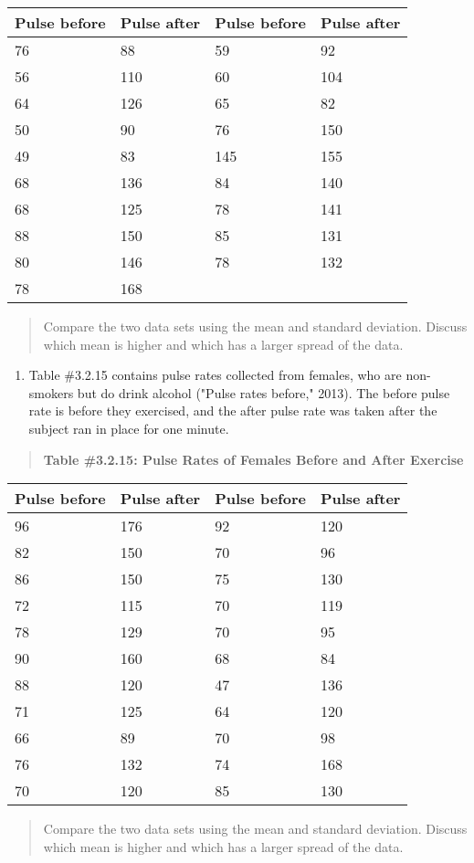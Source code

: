 \documentclass[]{book}
\providecommand{\tightlist}{%
  \setlength{\itemsep}{0pt}\setlength{\parskip}{0pt}}
\begin{document}
\begin{longtable}[]{@{}llll@{}}
\toprule
Pulse before & Pulse after & Pulse before & Pulse after\tabularnewline
\midrule
\endhead
76 & 88 & 59 & 92\tabularnewline
56 & 110 & 60 & 104\tabularnewline
64 & 126 & 65 & 82\tabularnewline
50 & 90 & 76 & 150\tabularnewline
49 & 83 & 145 & 155\tabularnewline
68 & 136 & 84 & 140\tabularnewline
68 & 125 & 78 & 141\tabularnewline
88 & 150 & 85 & 131\tabularnewline
80 & 146 & 78 & 132\tabularnewline
78 & 168 & &\tabularnewline
\bottomrule
\end{longtable}

\begin{quote}
Compare the two data sets using the mean and standard deviation.
Discuss which mean is higher and which has a larger spread of the
data.
\end{quote}

\begin{enumerate}
\def\labelenumi{\arabic{enumi}.}
\setcounter{enumi}{8}
\tightlist
\item
  Table \#3.2.15 contains pulse rates collected from females, who are
  non-smokers but do drink alcohol ("Pulse rates before," 2013). The
  before pulse rate is before they exercised, and the after pulse rate
  was taken after the subject ran in place for one minute.
\end{enumerate}

\begin{quote}
\textbf{Table \#3.2.15: Pulse Rates of Females Before and After Exercise}
\end{quote}

\begin{longtable}[]{@{}llll@{}}
\toprule
Pulse before & Pulse after & Pulse before & Pulse after\tabularnewline
\midrule
\endhead
96 & 176 & 92 & 120\tabularnewline
82 & 150 & 70 & 96\tabularnewline
86 & 150 & 75 & 130\tabularnewline
72 & 115 & 70 & 119\tabularnewline
78 & 129 & 70 & 95\tabularnewline
90 & 160 & 68 & 84\tabularnewline
88 & 120 & 47 & 136\tabularnewline
71 & 125 & 64 & 120\tabularnewline
66 & 89 & 70 & 98\tabularnewline
76 & 132 & 74 & 168\tabularnewline
70 & 120 & 85 & 130\tabularnewline
\bottomrule
\end{longtable}

\begin{quote}
Compare the two data sets using the mean and standard deviation.
Discuss which mean is higher and which has a larger spread of the
data.
\end{quote}
\end{document}
